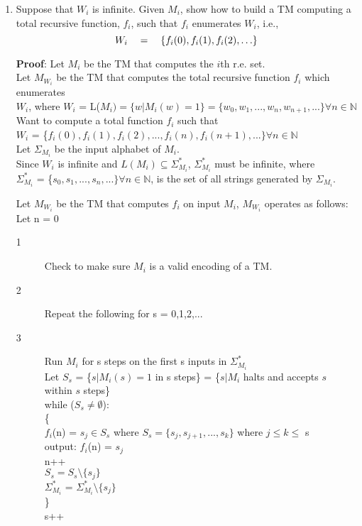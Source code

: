 \documentclass[12pt]{article}
\begin{document}
\begin{enumerate}
\begin{enumerate}
    
   \item Suppose that $W_i$ is infinite.  Given $M_i$, show how to build a TM computing a total
     recursive function, $f_i$, such that $f_i$ enumerates $W_i$, i.e., 
\[ W_i \quad =\quad \{ f_i(0), f_i(1), f_i(2), \ldots  \}\]

		\textbf{Proof}: Let $M_i$ be the TM that computes the $i$th r.e. set. 
		\\Let $M_{W_{i}}$ be the TM that computes the total recursive function $f_i$ which enumerates 
		\\$W_i$, where 
		$W_i$ = L($M_i) = \{w | M_{i}(w) = 1 \} = \{w_{0}, w_{1}, ..., w_{n}, w_{n+1}, ...\} \forall n \in \mathbb{N}$
		\\Want to compute a total function $f_i$ such that 
		\\$W_i$ = \{$f_{i}(0),f_{i}(1),f_{i}(2), ... , f_{i}(n), f_{i}(n+1), ... \} \forall n \in \mathbb{N}$
		\\Let $\Sigma_{M_{i}}$ be the input alphabet of $M_i$.
		\\Since $W_{i}$ is infinite and $L(M_{i}) \subseteq \Sigma_{M_{i}}^{*}$, $\Sigma_{M_{i}}^{*}$ must be infinite, where
		 \\$\Sigma_{M_{i}}^{*}$ = \{$s_{0}, s_{1}, ..., s_{n}, ...\}  \forall n \in \mathbb{N}$, is the set of all strings generated by $\Sigma_{M_{i}}$.  
		
		Let $M_{W_{i}}$ be the TM that computes $f_{i}$ on input $M_i$, $M_{W_{i}}$ operates as follows:
		\\	Let n = 0
		\begin{description}
			\item[1] Check to make sure $M_i$ is a valid encoding of a TM.
			\item[2] Repeat the following for s = 0,1,2,...
			\item[3] Run $M_{i}$ for s steps on the first s inputs in $\Sigma_{M_{i}}^{*}$
			\\Let $S_{s}$ = \{$s | M_{i}(s) = 1$ in s steps\} = \{$s | M_{i}$ halts and accepts $s$ within $s$ steps\}
			\\while ($S_{s} \neq \emptyset$):
			\\ \{ 	
			\\ $f_{i}$(n) = $s_{j} \in S_{s}$ where $S_{s} =\{s_{j}, s_{j+1}, ... , s_{k}\}$ where $j \leq k \leq$ s
			\\output: $f_{i}$(n) = $s_{j} $
			\\	n++
			\\	$S_{s}=S_{s}\setminus\{s_{j}\}$
			\\	$\Sigma_{M_{i}}^{*}$ = $\Sigma_{M_{i}}^{*} \setminus \{s_{j}\}$
			\\	\}
			\\s++
			

\end{description}
\end{enumerate}
\end{enumerate}
\end{document}
